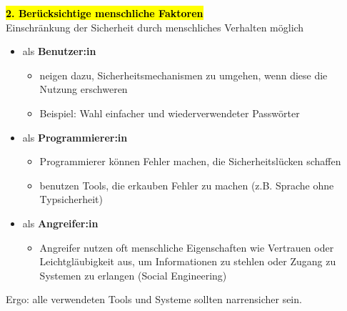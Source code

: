 \documentclass[a4paper, 10pt]{article}
\begin{document}
\noindent \hl{\textbf{2. Berücksichtige menschliche Faktoren}}\\[3mm]
Einschränkung der Sicherheit durch menschliches Verhalten möglich
\begin{itemize}
    \item als \textbf{Benutzer:in}
    \begin{itemize}
        \item neigen dazu, Sicherheitsmechanismen zu umgehen, wenn diese die Nutzung erschweren
        \item Beispiel: Wahl einfacher und wiederverwendeter Passwörter
    \end{itemize}
    \item als \textbf{Programmierer:in}
    \begin{itemize}
        \item Programmierer können Fehler machen, die Sicherheitslücken schaffen
        \item benutzen Tools, die erkauben Fehler zu machen (z.B. Sprache ohne Typsicherheit)
    \end{itemize}
    \item als \textbf{Angreifer:in}
    \begin{itemize}
        \item Angreifer nutzen oft menschliche Eigenschaften wie Vertrauen oder Leichtgläubigkeit aus, um Informationen zu stehlen oder Zugang zu Systemen zu erlangen (Social Engineering)
    \end{itemize}
\end{itemize}
Ergo: alle verwendeten Tools und Systeme sollten narrensicher sein.\\
\end{document}
